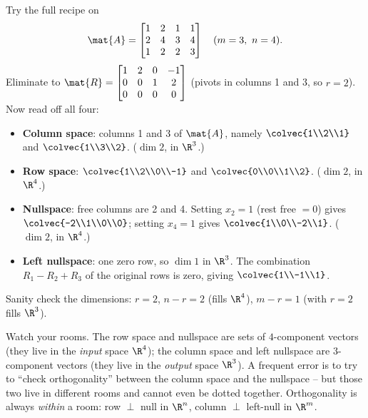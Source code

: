\begin{labbox}
Try the full recipe on
\[
  \mat{A} = \begin{bmatrix} 1 & 2 & 1 & 1\\ 2 & 4 & 3 & 4\\ 1 & 2 & 2 & 3 \end{bmatrix}
  \quad (m=3,\ n=4).
\]
Eliminate to $\mat{R}=\begin{bmatrix}1&2&0&-1\\0&0&1&2\\0&0&0&0\end{bmatrix}$ (pivots in columns 1
and 3, so $r=2$). Now read off all four:
\begin{itemize}
  \item \textbf{Column space}: columns 1 and 3 of $\mat{A}$, namely $\colvec{1\\2\\1}$ and
  $\colvec{1\\3\\2}$. ($\dim 2$, in $\R^3$.)
  \item \textbf{Row space}: $\colvec{1\\2\\0\\-1}$ and $\colvec{0\\0\\1\\2}$. ($\dim 2$, in
  $\R^4$.)
  \item \textbf{Nullspace}: free columns are 2 and 4. Setting $x_2=1$ (rest free $=0$) gives
  $\colvec{-2\\1\\0\\0}$; setting $x_4=1$ gives $\colvec{1\\0\\-2\\1}$. ($\dim 2$, in $\R^4$.)
  \item \textbf{Left nullspace}: one zero row, so $\dim 1$ in $\R^3$. The combination
  $R_1-R_2+R_3$ of the original rows is zero, giving $\colvec{1\\-1\\1}$.
\end{itemize}
Sanity check the dimensions: $r=2$, $n-r=2$ (fills $\R^4$), $m-r=1$ (with $r=2$ fills $\R^3$).
\end{labbox}

\begin{trapbox}
Watch your rooms. The row space and nullspace are sets of $4$-component vectors (they live in the
\emph{input} space $\R^4$); the column space and left nullspace are $3$-component vectors (they live
in the \emph{output} space $\R^3$). A frequent error is to try to ``check orthogonality'' between
the column space and the nullspace -- but those two live in different rooms and cannot even be
dotted together. Orthogonality is always \emph{within} a room: row $\perp$ null in $\R^n$, column
$\perp$ left-null in $\R^m$.
\end{trapbox}

